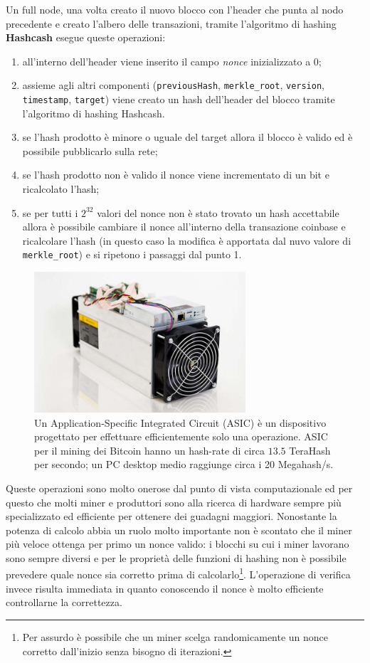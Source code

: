 Un full node, una volta creato il nuovo blocco con l'header che punta al nodo precedente e creato l'albero delle transazioni, tramite l'algoritmo di hashing \textbf{Hashcash} esegue queste operazioni:
\begin{enumerate}
    \item all'interno dell'header viene inserito il campo \textit{nonce} inizializzato a 0;
    \item assieme agli altri componenti (\texttt{previousHash}, \texttt{merkle\_root}, \texttt{version}, \texttt{timestamp}, \texttt{target}) viene creato un hash dell'header del blocco tramite l'algoritmo di hashing Hashcash.
    \item se l'hash prodotto è minore o uguale del target allora il blocco è valido ed è possibile pubblicarlo sulla rete;
    \item se l'hash prodotto non è valido il nonce viene incrementato di un bit e ricalcolato l'hash;
    \item se per tutti i $2^{32}$ valori del nonce non è stato trovato un hash accettabile allora è possibile cambiare il nonce all'interno della transazione coinbase e ricalcolare l'hash (in questo caso la modifica è apportata dal nuvo valore di \texttt{merkle\_root}) e si ripetono i passaggi dal punto 1.
\end{enumerate}
\begin{figure}[H]
    \centering
    \includegraphics[width=0.7\textwidth]{images/asic.jpg}
    \caption{Un Application-Specific Integrated Circuit (ASIC) è un dispositivo progettato per effettuare efficientemente solo una operazione. ASIC per il mining dei Bitcoin hanno un hash-rate di circa $13.5$ TeraHash per secondo; un PC desktop medio raggiunge circa i 20 Megahash/s.}
\end{figure}
Queste operazioni sono molto onerose dal punto di vista computazionale ed per questo che molti miner e produttori sono alla ricerca di hardware sempre più specializzato ed efficiente per ottenere dei guadagni maggiori. Nonostante la potenza di calcolo abbia un ruolo molto importante non è scontato che il miner più veloce ottenga per primo un nonce valido: i blocchi su cui i miner lavorano sono sempre diversi e per le proprietà delle funzioni di hashing non è possibile prevedere quale nonce sia corretto prima di calcolarlo\footnote{Per assurdo è possibile che un miner scelga randomicamente un nonce corretto dall'inizio senza bisogno di iterazioni.}. L'operazione di verifica invece risulta immediata in quanto conoscendo il nonce è molto efficiente controllarne la correttezza.\newline
